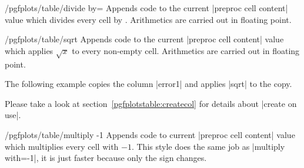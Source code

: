 \begin{stylekey}{/pgfplots/table/divide by=}
	Appends code to the current |preproc cell content| value which divides every cell by . Arithmetics are carried out in floating point.	
\end{stylekey}

\begin{stylekey}{/pgfplots/table/sqrt}
	Appends code to the current |preproc cell content| value which applies $\sqrt{x}$ to every non-empty cell. Arithmetics are carried out in floating point.	

	The following example copies the column |error1| and applies |sqrt| to the copy.
\begin{codeexample}[]
\end{codeexample}
	Please take a look at section~\ref{pgfplotstable:createcol} for details about |create on use|.
\end{stylekey}

\begin{stylekey}{/pgfplots/table/multiply -1}
	Appends code to current |preproc cell content| value which multiplies every cell with $-1$. This style does the same job as |multiply with=-1|, it is just faster because only the sign changes.
\begin{codeexample}[]


\end{codeexample}
\end{stylekey}

